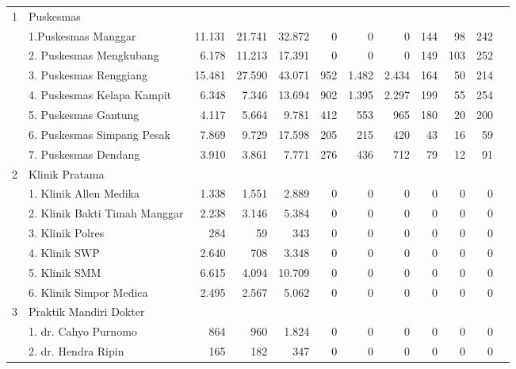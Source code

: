 {\begin{small}
\begin{tabular}{cY{34em}rrrrrrrrrr}
    1 & Puskesmas & & & & & & & & & \\
      & 1.Puskesmas Manggar                           &  11.131 &  21.741 &  32.872 &      0 &      0 &       0 &   144 &    98 &    242 \\
      & 2. Puskesmas Mengkubang                       &   6.178 &  11.213 &  17.391 &      0 &      0 &       0 &   149 &   103 &    252 \\
      & 3. Puskesmas Renggiang                        &  15.481 &  27.590 &  43.071 &    952 &  1.482 &   2.434 &   164 &    50 &    214 \\
      & 4. Puskesmas Kelapa Kampit                    &   6.348 &   7.346 &  13.694 &    902 &  1.395 &   2.297 &   199 &    55 &    254 \\
      & 5. Puskesmas Gantung                          &   4.117 &   5.664 &   9.781 &    412 &    553 &     965 &   180 &    20 &    200 \\
      & 6. Puskesmas Simpang Pesak                    &   7.869 &   9.729 &  17.598 &    205 &    215 &     420 &    43 &    16 &     59 \\
      & 7. Puskesmas Dendang                          &   3.910 &   3.861 &   7.771 &    276 &    436 &     712 &    79 &    12 &     91 \\
    2 & Klinik Pratama & & & & & & & & & \\                               
      & 1. Klinik Allen Medika                        &   1.338 &   1.551 &   2.889 &      0 &      0 &       0 &     0 &     0 &      0 \\
	  & 2. Klinik Bakti Timah Manggar                 &   2.238 &   3.146 &   5.384 &      0 &      0 &       0 &     0 &     0 &      0 \\
	  & 3. Klinik Polres                              &     284 &      59 &     343 &      0 &      0 &       0 &     0 &     0 &      0 \\
	  & 4. Klinik SWP                                 &   2.640 &     708 &   3.348 &      0 &      0 &       0 &     0 &     0 &      0 \\
	  & 5. Klinik SMM                                 &   6.615 &   4.094 &  10.709 &      0 &      0 &       0 &     0 &     0 &      0 \\
	  & 6. Klinik Simpor Medica                       &   2.495 &   2.567 &   5.062 &      0 &      0 &       0 &     0 &     0 &      0 \\
	3 & Praktik Mandiri Dokter & & & & & & & & & \\                                                       
	  & 1. dr. Cahyo Purnomo                          &     864 &     960 &   1.824 &      0 &      0 &       0 &     0 &     0 &      0 \\
	  & 2. dr. Hendra Ripin                           &     165 &     182 &     347 &      0 &      0 &       0 &     0 &     0 &      0 \\
    \end{tabular}%
    \end{small}

}

